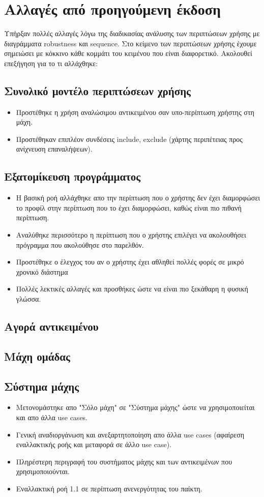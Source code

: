 \section*{Αλλαγές από προηγούμενη έκδοση}
Υπήρξαν πολλές αλλαγές λόγω της διαδικασίας ανάλυσης των περιπτώσεων χρήσης με διαγράμματα robustness και sequence. Στο κείμενο των περιπτώσεων χρήσης έχουμε σημειώσει με κόκκινο κάθε κομμάτι του κειμένου που είναι διαφορετικό. Ακολουθεί επεξήγηση για το τι αλλάχθηκε:
\subsection{Συνολικό μοντέλο περιπτώσεων χρήσης}
\begin{itemize}
\item Προστέθηκε η χρήση αναλώσιμου αντικειμένου σαν υπο-περίπτωση χρήστης στη μάχη.
\item Προστέθηκαν επιπλέον συνδέσεις include, exclude (χάρτης περιπέτειας προς ανίχνευση επαναλήψεων).
\end{itemize}
\subsection{Εξατομίκευση προγράμματος}
\begin{itemize}
    \item Η βασική ροή αλλάχθηκε απο την περίπτωση που ο χρήστης δεν έχει διαμορφώσει το προφίλ στην περίπτωση που το έχει διαμορφώσει, καθώς είναι πιο πιθανή περίπτωση.
    \item Αναλύθηκε περισσότερο η περίπτωση που ο χρήστης επιλέγει να ακολουθήσει πρόγραμμα που ακολούθησε στο παρελθόν.
    \item Προστέθηκε ο έλεγχος του αν ο χρήστης έχει αθληθεί πολλές φορές σε μικρό χρονικό διάστημα
    \item Πολλές λεκτικές αλλαγές και προσθήκες ώστε να είναι πιο ξεκάθαρη η φυσική γλώσσα.
\end{itemize}
\subsection{Αγορά αντικειμένου}
\subsection{Μάχη ομάδας}
\subsection{Σύστημα μάχης}
\begin{itemize}
    \item Μετονομάστηκε απο "Σόλο μάχη" σε "Σύστημα μάχης" ώστε να χρησιμοποιείται και απο άλλα use cases.
    \item Γενική αναδιοργάνωση και ανεξαρτητοποίηση απο άλλα use cases (αφαίρεση εναλλακτικής ροής και μεταφορά σε άλλο use case).
    \item Πληρέστερη περιγραφή του συστήματος μάχης και των αντικειμένων που χρησιμοποιούνται.
    \item Εναλλακτική ροή 1.1 σε περίπτωση ανενεργότητας του παίκτη.
\end{itemize}
